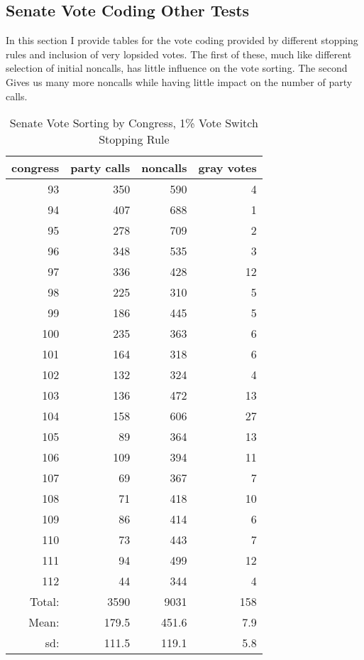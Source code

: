 \documentclass[12pt]{article}
\begin{document}
\clearpage

\subsection{Senate Vote Coding Other Tests}

In this section I provide tables for the vote coding provided by different stopping rules and inclusion of very lopsided votes. The first of these, much like different selection of initial noncalls, has little influence on the vote sorting. The second Gives us many more noncalls while having little impact on the number of party calls.

\begin{table}[ht]
	\centering
	\caption{Senate Vote Sorting by Congress, 1\% Vote Switch Stopping Rule}
	\begin{tabular}{rrrr}
		\hline
		congress & party calls & noncalls & gray votes \\
		\hline
		93 & 350 & 590 &   4 \\
		94 & 407 & 688 &   1 \\
		95 & 278 & 709 &   2 \\
		96 & 348 & 535 &   3 \\
		97 & 336 & 428 &  12 \\
		98 & 225 & 310 &   5 \\
		99 & 186 & 445 &   5 \\
		100 & 235 & 363 &   6 \\
		101 & 164 & 318 &   6 \\
		102 & 132 & 324 &   4 \\
		103 & 136 & 472 &  13 \\
		104 & 158 & 606 &  27 \\
		105 &  89 & 364 &  13 \\
		106 & 109 & 394 &  11 \\
		107 &  69 & 367 &   7 \\
		108 &  71 & 418 &  10 \\
		109 &  86 & 414 &   6 \\
		110 &  73 & 443 &   7 \\
		111 &  94 & 499 &  12 \\
		112 &  44 & 344 &   4 \\
		\hline
		Total: & 3590 & 9031 & 158 \\
		Mean: & 179.5 & 451.6 & 7.9 \\
		sd: & 111.5 & 119.1 & 5.8 \\
		\hline
	\end{tabular}
\end{table}
\end{document}
